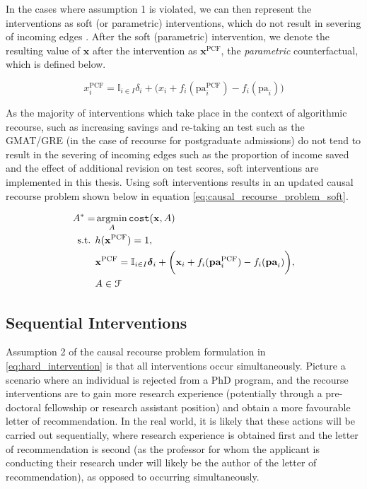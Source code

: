 In the cases where assumption 1 is violated, we can then represent the interventions as soft (or parametric) interventions, which do not result in severing of incoming edges \citep{eberhardtInterventionsCausalInference2007}. After the soft (parametric) intervention, we denote the resulting value of $\mathbf{x}$ after the intervention as $\mathbf{x}^{\text{PCF}}$, the \textit{parametric} counterfactual, which is defined below.

\begin{equation} \label{eq:soft_interventions}
	x^{\text{PCF}}_i = \mathbb{I}_{i \in I} \delta_i + \bigg( x_i + f_i(\text{pa}^{\text{PCF}}_i) - f_i(\text{pa}_i) \bigg)
\end{equation}

As the majority of interventions which take place in the context of algorithmic recourse, such as increasing savings and re-taking an test such as the GMAT/GRE (in the case of recourse for postgraduate admissions) do not tend to result in the severing of incoming edges such as the proportion of income saved and the effect of additional revision on test scores, soft interventions are implemented in this thesis. Using soft interventions results in an updated causal recourse problem shown below in equation \ref{eq:causal_recourse_problem_soft}.

\begin{align} \label{eq:causal_recourse_problem_soft}
	A^* = & \operatorname*{argmin}_{A} \texttt{cost}(\mathbf{x}, A) \\ \nonumber
	\text{s.t. } & h(\mathbf{x}^{\text{PCF}}) = 1, \\ \nonumber
	& 	\mathbf{x}^{\text{PCF}} = \mathbb{I}_{i \in I} \boldsymbol{\delta}_i + \bigg( \mathbf{x}_i + f_i(\textbf{pa}^{\text{PCF}}_i) - f_i(\textbf{pa}_i) \bigg), \\ \nonumber
	& A \in \mathcal{F}
\end{align} 


\subsection{Sequential Interventions}

Assumption 2 of the causal recourse problem formulation in \ref{eq:hard_intervention} is that all interventions occur simultaneously. Picture a scenario where an individual is rejected from a PhD program, and the recourse interventions are to gain more research experience (potentially through a pre-doctoral fellowship or research assistant position) and obtain a more favourable letter of recommendation. In the real world, it is likely that these actions will be carried out sequentially, where research experience is obtained first and the letter of recommendation is second (as the professor for whom the applicant is conducting their research under will likely be the author of the letter of recommendation), as opposed to occurring simultaneously.

